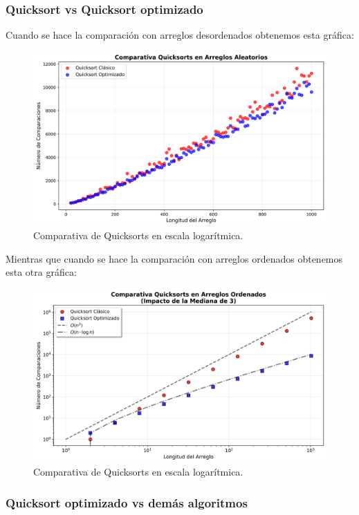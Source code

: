 \documentclass[conference]{IEEEtran}
\begin{document}
\subsubsection{Quicksort vs Quicksort optimizado}
Cuando se hace la comparación con arreglos desordenados obtenemos esta gráfica:
\begin{figure}[H]
    \centering
    \includegraphics[scale=0.35]{Exp1A.png}
    \caption{Comparativa de Quicksorts en escala logarítmica.}\label{fig:exp1A}
\end{figure}

Mientras que cuando se hace la comparación con arreglos ordenados obtenemos esta otra gráfica:

\begin{figure}[H]
    \centering
    \includegraphics[scale=0.35]{Exp1B.png}
    \caption{Comparativa de Quicksorts en escala logarítmica.}\label{fig:exp1B}
\end{figure}

\subsubsection{Quicksort optimizado vs demás algoritmos}
\end{document}
